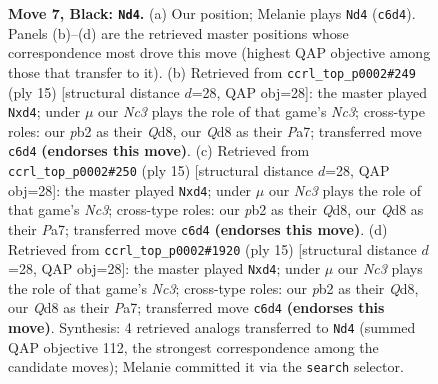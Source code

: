 \documentclass[11pt]{article}
\begin{document}
\begin{figure}[p]
\caption{\textbf{Move 7, Black: \texttt{Nd4}.} (a) Our position; Melanie plays \texttt{Nd4} (\texttt{c6d4}). Panels (b)--(d) are the retrieved master positions whose correspondence most drove this move (highest QAP objective among those that transfer to it). (b) Retrieved from \texttt{ccrl\_top\_p0002\#249} (ply 15) [structural distance $d$=28, QAP obj=28]: the master played \texttt{Nxd4}; under $\mu$ our \emph{Nc3} plays the role of that game's \emph{Nc3}; cross-type roles: our \emph{p}b2 as their \emph{Q}d8, our \emph{Q}d8 as their \emph{P}a7; transferred move \texttt{c6d4} \textbf{(endorses this move)}. (c) Retrieved from \texttt{ccrl\_top\_p0002\#250} (ply 15) [structural distance $d$=28, QAP obj=28]: the master played \texttt{Nxd4}; under $\mu$ our \emph{Nc3} plays the role of that game's \emph{Nc3}; cross-type roles: our \emph{p}b2 as their \emph{Q}d8, our \emph{Q}d8 as their \emph{P}a7; transferred move \texttt{c6d4} \textbf{(endorses this move)}. (d) Retrieved from \texttt{ccrl\_top\_p0002\#1920} (ply 15) [structural distance $d$=28, QAP obj=28]: the master played \texttt{Nxd4}; under $\mu$ our \emph{Nc3} plays the role of that game's \emph{Nc3}; cross-type roles: our \emph{p}b2 as their \emph{Q}d8, our \emph{Q}d8 as their \emph{P}a7; transferred move \texttt{c6d4} \textbf{(endorses this move)}. Synthesis: 4 retrieved analogs transferred to \texttt{Nd4} (summed QAP objective 112, the strongest correspondence among the candidate moves); Melanie committed it via the \texttt{search} selector.}
\label{fig:thought-m13}
\end{figure}

\clearpage
\end{document}
